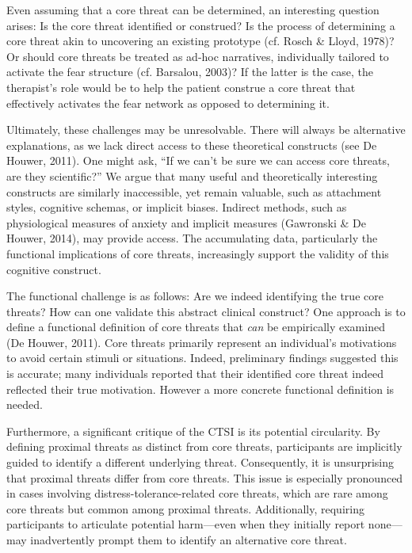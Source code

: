 \documentclass[
  man,floatsintext]{apa7}
\begin{document}
Even assuming that a core threat can be determined, an interesting question arises: Is the core threat identified or construed?
Is the process of determining a core threat akin to uncovering an existing prototype (cf. Rosch \& Lloyd, 1978)?
Or should core threats be treated as ad-hoc narratives, individually tailored to activate the fear structure (cf. Barsalou, 2003)?
If the latter is the case, the therapist's role would be to help the patient construe a core threat that effectively activates the fear network as opposed to determining it.

Ultimately, these challenges may be unresolvable.
There will always be alternative explanations, as we lack direct access to these theoretical constructs (see De Houwer, 2011).
One might ask, ``If we can't be sure we can access core threats, are they scientific?''
We argue that many useful and theoretically interesting constructs are similarly inaccessible, yet remain valuable, such as attachment styles, cognitive schemas, or implicit biases.
Indirect methods, such as physiological measures of anxiety and implicit measures (Gawronski \& De Houwer, 2014), may provide access.
The accumulating data, particularly the functional implications of core threats, increasingly support the validity of this cognitive construct.

The functional challenge is as follows: Are we indeed identifying the true core threats?
How can one validate this abstract clinical construct?
One approach is to define a functional definition of core threats that \emph{can} be empirically examined (De Houwer, 2011).
Core threats primarily represent an individual's motivations to avoid certain stimuli or situations.
Indeed, preliminary findings suggested this is accurate; many individuals reported that their identified core threat indeed reflected their true motivation.
However a more concrete functional definition is needed.

Furthermore, a significant critique of the CTSI is its potential circularity.
By defining proximal threats as distinct from core threats, participants are implicitly guided to identify a different underlying threat.
Consequently, it is unsurprising that proximal threats differ from core threats.
This issue is especially pronounced in cases involving distress-tolerance-related core threats, which are rare among core threats but common among proximal threats.
Additionally, requiring participants to articulate potential harm---even when they initially report none---may inadvertently prompt them to identify an alternative core threat.
\end{document}

